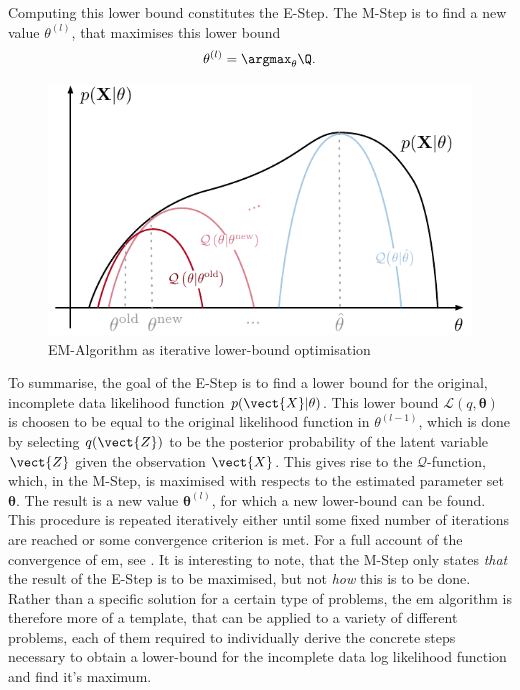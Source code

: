 Computing this lower bound constitutes the E-Step. The M-Step is to find a new value $\theta^{(l)}$, that maximises this lower bound
\begin{equation}
\label{eq:m-step}
    \theta^{(l)} = \argmax_{\theta}\Q.
\end{equation}

\begin{figure}[!hb]
\label{fig:em}
\centering
    \includegraphics[scale=1]{data/figures/em-Q3}
    \caption{EM-Algorithm as iterative lower-bound optimisation}
\end{figure}

To summarise, the goal of the E-Step is to find a lower bound for the original, incomplete data likelihood function $p(\vect{X}\vert\theta)$. This lower bound $\mathcal{L}(q,\bm\theta)$ is choosen to be equal to the original likelihood function in $\theta^{(l-1)}$, which is done by selecting $q(\vect{Z})$ to be the posterior probability of the latent variable $\vect{Z}$ given the observation $\vect{X}$. This gives rise to the $\mathcal{Q}$-function, which, in the M-Step, is maximised with respects to the estimated parameter set $\bm\theta$. The result is a new value $\bm\theta^{(l)}$, for which a new lower-bound can be found. This procedure is repeated iteratively either until some fixed number of iterations are reached or some convergence criterion is met. For a full account of the convergence of \gls{em}, see \cite{Wu1983}. It is interesting to note, that the M-Step only states \textit{that} the result of the E-Step is to be maximised, but not \textit{how} this is to be done. Rather than a specific solution for a certain type of problems, the \gls{em} algorithm is therefore more of a template, that can be applied to a variety of different problems, each of them required to individually derive the concrete steps necessary to obtain a lower-bound for the incomplete data log likelihood function and find it's maximum.

